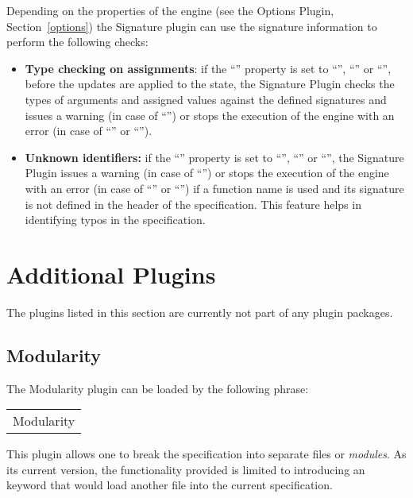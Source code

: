 \documentclass{article}
\newcommand{\codebf}[1]{\xspace{\bf \code{#1}}\xspace}
\newcommand{\keyword}[1]{\codebf{#1}}
\newcommand{\bExample}{\begin{small} \vspace{0.3cm} \begin{tabular}{|l} \begin{minipage}{0.85\textwidth} \vspace{0.2cm} \ttfamily}
\newcommand{\eExample}{\vspace{0.2cm} \end{minipage} \end{tabular} \vspace{0.3cm} \end{small}}
\begin{document}
\medskip

Depending on the properties of the engine (see the Options Plugin, Section~\ref{options}) the Signature plugin can use the signature information 
to perform the following checks:
\begin{itemize}

\item {\bf Type checking on assignments}: if the
``'' property is set to ``'',
``'' or ``'', before the updates are applied to the
state, the Signature Plugin checks the types of arguments and assigned values
against the defined signatures and issues a warning (in case of
``'') or stops the execution of the engine with an error (in case
of ``'' or ``'').     


\item {\bf Unknown identifiers:} if the ``''
property is set to ``'', ``'' or ``'', the
Signature Plugin issues a warning (in case of ``'') or stops the
execution of the engine with an error (in case of ``'' or
``'') if a function name is used and its signature is not defined in
the header of the specification. This feature helps in identifying typos
in the specification. 

\end{itemize}

\section{Additional Plugins}
\label{additional}

The plugins listed in this section are currently not part of any plugin packages.

\subsection{Modularity}
\label{Modularity}

The Modularity plugin can be loaded by the following \keyword{use} phrase:

\bExample
	\codebf{use} Modularity
\eExample

This plugin allows one to break the specification into separate files or {\em modules}. As its current version, 
the functionality provided is limited to introducing an \codebf{include} keyword that would load another file 
into the current specification. 
\end{document}
